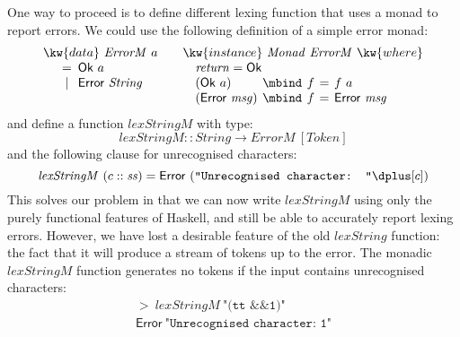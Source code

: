One way to proceed is to define different lexing function that uses a
monad to report errors. We could use the following definition of a
simple error monad:
\begin{displaymath}
  \begin{array}{ll}
    \begin{array}[t]{l}
      \kw{data}~\mathit{ErrorM}~a \\
      \quad
      \begin{array}{c@{\hspace{0.5em}}l}
        = & \mathsf{Ok}~a \\
        | & \mathsf{Error}~\mathit{String}
      \end{array}
    \end{array}
    &
    \begin{array}[t]{l}
      \kw{instance}~\mathit{Monad}~\mathit{ErrorM}~\kw{where} \\
      \quad \mathit{return} = \mathsf{Ok} \\
      \quad
      \begin{array}{@{}l@{\hspace{0.4em}}c@{\hspace{0.4em}}l@{\hspace{0.4em}}c@{\hspace{0.4em}}l}
        (\mathsf{Ok}~a) &\mbind &f &=& f~a \\
        (\mathsf{Error}~\mathit{msg}) &\mbind& f& =& \mathsf{Error}~\mathit{msg}
      \end{array}
    \end{array}
  \end{array}
\end{displaymath} %
and define a function $\mathit{lexStringM}$ with type:
\begin{displaymath}
  \mathit{lexStringM} :: \mathit{String} \to \mathit{ErrorM}~[\mathit{Token}]
\end{displaymath}
and the following clause for unrecognised characters:
\begin{displaymath}
  \mathit{lexStringM}~(c :: \mathit{ss}) = \mathsf{Error}~(\texttt{"Unrecognised character: "} \dplus [c])
\end{displaymath}
This solves our problem in that we can now write $\mathit{lexStringM}$
using only the purely functional features of Haskell, and still be
able to accurately report lexing errors. However, we have lost a
desirable feature of the old $\mathit{lexString}$ function: the fact
that it will produce a stream of tokens up to the error. The monadic
$\mathit{lexStringM}$ function generates no tokens if the input
contains unrecognised characters:
\begin{displaymath}
  \begin{array}{l}
    >~\mathit{lexStringM}~\texttt{"(tt \&\& 1)"} \\
    \mathsf{Error}~\texttt{"Unrecognised character: 1"}
  \end{array}
\end{displaymath}

